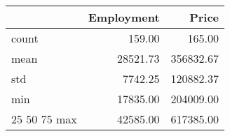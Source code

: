 \begin{tabular}{lrr}
\toprule
 & Employment & Price \\
\midrule
count & 159.00 & 165.00 \\
mean & 28521.73 & 356832.67 \\
std & 7742.25 & 120882.37 \\
min & 17835.00 & 204009.00 \\
25%
50%
75%
max & 42585.00 & 617385.00 \\
\bottomrule
\end{tabular}
